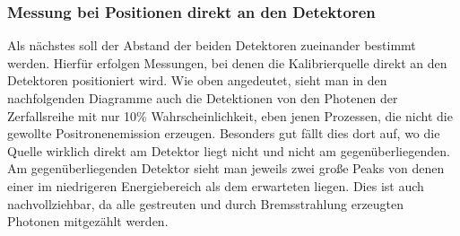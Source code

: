     \subsubsection{Messung bei Positionen direkt an den Detektoren}
        Als nächstes soll der Abstand der beiden Detektoren zueinander bestimmt werden. Hierfür erfolgen Messungen, bei denen die Kalibrierquelle direkt an den Detektoren positioniert wird.
        Wie oben angedeutet, sieht man in den nachfolgenden Diagramme auch die Detektionen von den Photenen der Zerfallsreihe mit nur 10\% Wahrscheinlichkeit, eben jenen Prozessen, die nicht
        die gewollte Positronenemission erzeugen. Besonders gut fällt dies dort auf, wo die Quelle wirklich direkt am Detektor liegt nicht und nicht am gegenüberliegenden.
        Am gegenüberliegenden Detektor sieht man jeweils zwei große Peaks von denen einer im niedrigeren Energiebereich als dem erwarteten liegen.
        Dies ist auch nachvollziehbar, da alle gestreuten und durch Bremsstrahlung erzeugten Photonen mitgezählt werden.
